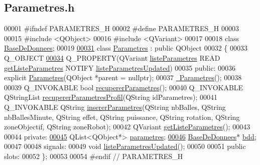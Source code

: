 \hypertarget{_parametres_8h_source}{}\subsection{Parametres.\+h}
\label{_parametres_8h_source}

\begin{DoxyCode}
00001 \textcolor{preprocessor}{#ifndef PARAMETRES\_H}
00002 \textcolor{preprocessor}{#define PARAMETRES\_H}
00003 
00015 \textcolor{preprocessor}{#include <QObject>}
00016 \textcolor{preprocessor}{#include <QVariant>}
00017 
00018 \textcolor{keyword}{class }\hyperlink{class_base_de_donnees}{BaseDeDonnees};
00019 
\hyperlink{class_parametres}{00031} \textcolor{keyword}{class }\hyperlink{class_parametres}{Parametres} : \textcolor{keyword}{public} QObject
00032 \{
00033     Q\_OBJECT
\hyperlink{class_parametres_ab37e24ed02c5ff1ffc7bea41016c93ca}{00034}     Q\_PROPERTY(QVariant \hyperlink{class_parametres_ab37e24ed02c5ff1ffc7bea41016c93ca}{listeParametres} READ \hyperlink{class_parametres_a1cd756fd21518bcec9349c08a2a3b08f}{getListeParametres}  NOTIFY 
      \hyperlink{class_parametres_aa6649347b6e61f767dc14346f2ea858e}{listeParametresUpdated})
00035 \textcolor{keyword}{public}:
00036     \textcolor{keyword}{explicit} \hyperlink{class_parametres_a5197a69e0f07e253e6119b4af95344f4}{Parametres}(QObject *parent = \textcolor{keyword}{nullptr});
00037     \hyperlink{class_parametres_a83068e95596ef05b4307b43b67ffc24d}{~Parametres}();
00038 
00039     Q\_INVOKABLE \textcolor{keywordtype}{bool} \hyperlink{class_parametres_a853872796d32655f3f1ffc090b6d076a}{recupererParametres}();
00040     Q\_INVOKABLE QStringList \hyperlink{class_parametres_ac91b8cb3a293f27eeb7d87673889de15}{recupererParametresProfil}(QString idParametres);
00041     Q\_INVOKABLE QString \hyperlink{class_parametres_a0102cadfb1bce5a8e82d6c12661fccf8}{insererParametres}(QString nbBalles, QString nbBallesMinute, 
      QString effet, QString puissance, QString rotation, QString zoneObjectif, QString zoneRobot);
00042     QVariant \hyperlink{class_parametres_a1cd756fd21518bcec9349c08a2a3b08f}{getListeParametres}();
00043 
00044 \textcolor{keyword}{private}:
\hyperlink{class_parametres_a3bff192351dd25f4109b258e954cecbf}{00045}     QList<QObject*> \hyperlink{class_parametres_a3bff192351dd25f4109b258e954cecbf}{parametres};
\hyperlink{class_parametres_a1e21034f7e758d93974e0dc070d47dee}{00046}     \hyperlink{class_base_de_donnees}{BaseDeDonnees}* \hyperlink{class_parametres_a1e21034f7e758d93974e0dc070d47dee}{bdd};
00047 
00048 signals:
00049     \textcolor{keywordtype}{void} \hyperlink{class_parametres_aa6649347b6e61f767dc14346f2ea858e}{listeParametresUpdated}();
00050 
00051 \textcolor{keyword}{public} slots:
00052 \};
00053 
00054 \textcolor{preprocessor}{#endif // PARAMETRES\_H}
\end{DoxyCode}
